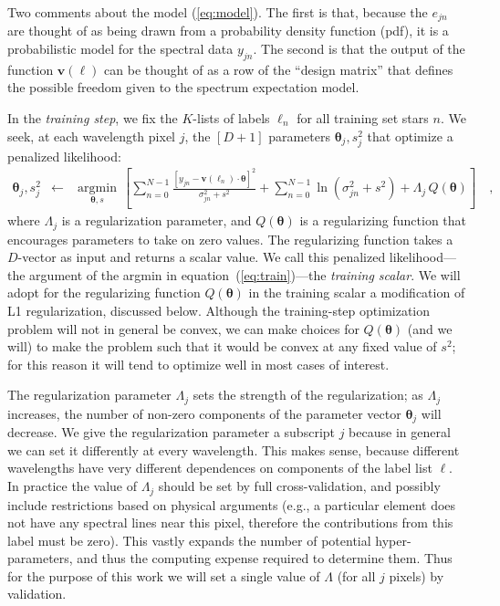 \documentclass[12pt,preprint]{aastex}
\newcommand{\Dvector}[1]{\boldsymbol{#1}}
\newcommand{\vectheta}{\Dvector{\theta}}
\newcommand{\vecv}{\Dvector{v}}
\newcommand{\argmin}[1]{\underset{#1}{\operatorname{argmin}}\,}
\begin{document}
Two comments about the model (\ref{eq:model}).  The first is that, because the 
$e_{jn}$ are thought of as being drawn from a probability density function (pdf),
it is a probabilistic model for the spectral data $y_{jn}$.  The second is that
the output of the function $\vecv(\ell)$ can be thought of as a row of the 
``design matrix'' that defines the possible freedom given to the spectrum 
expectation model.


In the \emph{training step}, we fix the $K$-lists of labels $\ell_n$ for all 
training set stars $n$.  We seek, at each wavelength pixel $j$, the $[D+1]$ 
parameters $\vectheta_j,s^2_j$ that optimize a penalized likelihood:
\begin{eqnarray}\label{eq:train}
  \vectheta_j,s^2_j &\leftarrow& \argmin{\vectheta,s}\left[
    \sum_{n=0}^{N-1} \frac{[y_{jn}-\vecv(\ell_n)\cdot\vectheta]^2}{\sigma^2_{jn}+s^2}
    + \sum_{n=0}^{N-1} \ln(\sigma^2_{jn}+s^2)
    + \Lambda_j\,Q(\vectheta)
    \right]
  \quad ,
\end{eqnarray}
where $\Lambda_j$ is a regularization parameter, and $Q(\vectheta)$ is a 
regularizing function that encourages parameters to take on zero values.  The 
regularizing function takes a $D$-vector as input and returns a scalar value.
We call this penalized likelihood---the argument of the argmin in 
equation~(\ref{eq:train})---the \emph{training scalar}.  We will adopt for the 
regularizing function $Q(\vectheta)$ in the training scalar a modification of L1
regularization, discussed below.  Although the training-step optimization 
problem will not in general be convex, we can make choices for $Q(\vectheta)$ 
(and we will) to make the problem such that it would be convex at any fixed 
value of $s^2$; for this reason it will tend to optimize well in most cases of 
interest.


The regularization parameter $\Lambda_j$ sets the strength of the 
regularization; as $\Lambda_j$ increases, the number of non-zero components of 
the parameter vector $\vectheta_j$ will decrease.  We give the regularization 
parameter a subscript $j$ because in general we can set it differently at every
wavelength.  This makes sense, because different wavelengths have very different
dependences on components of the label list $\ell$.  In practice the
value of $\Lambda_j$ should be set by full cross-validation, and possibly 
include restrictions based on physical arguments (e.g., a particular element 
does not have any spectral lines near this pixel, therefore the contributions
from this label must be zero).  This vastly expands the number of potential 
hyper-parameters, and thus the computing expense required to determine them.  
Thus for the purpose of this work we will set a single value of $\Lambda$ (for 
all $j$ pixels) by validation.
\end{document}
